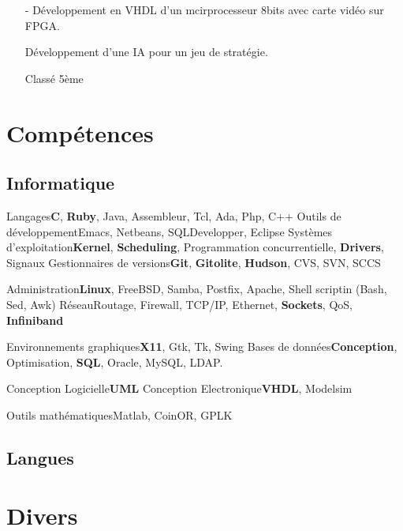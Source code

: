 \documentclass[10pt,a4paper]{moderncv}
\begin{document}
{
\begin{itemize}
\item[-]{Développement en VHDL d'un mcirprocesseur 8bits avec carte vidéo sur FPGA.}
\end{itemize}
}

{
\begin{itemize}
\item[]{Développement d'une IA pour un jeu de stratégie.}
\item[]{Classé 5ème}
\end{itemize}
}

\section{Compétences}
\subsection{Informatique}
\cvcomputer
{Langages}{\textbf{C}, \textbf{Ruby}, Java, Assembleur, Tcl, Ada, Php, C++}
{Outils de développement}{Emacs, Netbeans, SQLDevelopper, Eclipse}
\cvcomputer
{Systèmes d'exploitation}{\textbf{Kernel}, \textbf{Scheduling}, Programmation concurrentielle, \textbf{Drivers}, Signaux}
{Gestionnaires de versions}{\textbf{Git}, \textbf{Gitolite}, \textbf{Hudson}, CVS, SVN, SCCS}


\cvcomputer
{Administration}{\textbf{Linux}, FreeBSD, Samba, Postfix, Apache, Shell scriptin (Bash, Sed, Awk)}
{Réseau}{Routage, Firewall, TCP/IP, Ethernet, \textbf{Sockets}, QoS, \textbf{Infiniband}}

\cvcomputer
{Environnements graphiques}{\textbf{X11}, Gtk, Tk, Swing}
{Bases de données}{\textbf{Conception}, Optimisation, \textbf{SQL}, Oracle, MySQL, LDAP.}

\cvcomputer
{Conception Logicielle}{\textbf{UML}}
{Conception Electronique}{\textbf{VHDL}, Modelsim}

\cvcomputer
{Outils mathématiques}{Matlab, CoinOR, GPLK}{}{}

\subsection{Langues}

\section{Divers}
\end{document}
